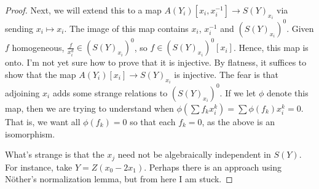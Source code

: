 \begin{proof}
    Next, we will extend this to a map $A(Y_i)[x_i, x_i^{-1}] \longrightarrow S(Y)_{x_i}$ via sending $x_i \mapsto x_i$. The image of this map contains $x_i$, $x_i^{-1}$ and $(S(Y)_{x_i})^0$. Given $f$ homogeneous, $\frac{f}{x_i^d} \in (S(Y)_{x_i})^0$, so $f \in (S(Y)_{x_i})^0[x_i]$. Hence, this map is onto. I'm not yet sure how to prove that it is injective. By flatness, it suffices to show that the map $A(Y_i)[x_i] \longrightarrow S(Y)_{x_i}$ is injective. The fear is that adjoining $x_i$ adds some strange relations to $(S(Y)_{x_i})^0$. If we let $\phi$ denote this map, then we are trying to understand when $\phi(\sum f_k x_i^k) = \sum \phi(f_k) x_i^k = 0$. That is, we want all $\phi(f_k) = 0$ so that each $f_k = 0$, as the above is an isomorphism. 

    What's strange is that the $x_j$ need not be algebraically independent in $S(Y)$. For instance, take $Y = Z(x_0 - 2 x_1)$. Perhaps there is an approach using N\"other's normalization lemma, but from here I am stuck.
\end{proof}                                                                              
